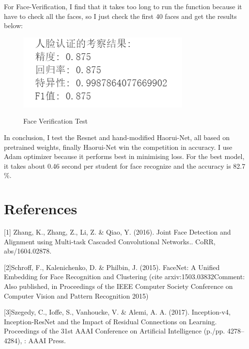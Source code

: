 \documentclass{article}
\begin{document}
For Face-Verification, I find that it takes too long to run the function because it have to check all the faces, so I just check the first 40 faces and get the results below:
\begin{figure}[H]%
  \centering
  \caption{Face Verification Test}
  \includegraphics[width=40ex]{IMG/人脸认证.png} %
  \label{Fig.RNN} %
\end{figure}

In conclusion, I test the Resnet and hand-modified Haorui-Net, all based on pretrained weights, finally Haorui-Net win the competition in accuracy. I use Adam optimizer because it performs best in minimising loss. For the best model, it takes about 0.46 second per student for face recognize and the accuracy is 82.7 $\%$.

\section*{References}


\medskip

\small

[1] Zhang, K., Zhang, Z., Li, Z. & Qiao, Y. (2016). Joint Face Detection and Alignment using Multi-task Cascaded Convolutional Networks.. CoRR, abs/1604.02878.

[2]Schroff, F., Kalenichenko, D. & Philbin, J. (2015). FaceNet: A Unified Embedding for Face Recognition and Clustering (cite arxiv:1503.03832Comment: Also published, in Proceedings of the IEEE Computer Society Conference on Computer Vision and Pattern Recognition 2015)

[3]Szegedy, C., Ioffe, S., Vanhoucke, V. & Alemi, A. A. (2017). Inception-v4, Inception-ResNet and the Impact of Residual Connections on Learning. Proceedings of the 31st AAAI Conference on Artificial Intelligence (p./pp. 4278--4284), : AAAI Press.
\end{document}
